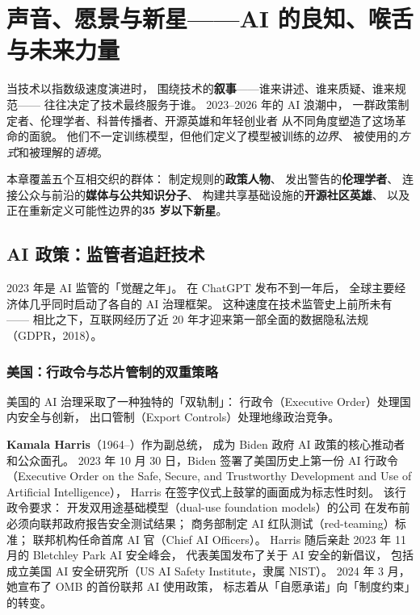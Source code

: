 \chapter{声音、愿景与新星——AI 的良知、喉舌与未来力量}
\label{ch:policy-rising}

当技术以指数级速度演进时，
围绕技术的\textbf{叙事}——谁来讲述、谁来质疑、谁来规范——
往往决定了技术最终服务于谁。
2023--2026 年的 AI 浪潮中，
一群政策制定者、伦理学者、科普传播者、开源英雄和年轻创业者
从不同角度塑造了这场革命的面貌。
他们不一定训练模型，但他们定义了模型被训练的\emph{边界}、
被使用的\emph{方式}和被理解的\emph{语境}。

本章覆盖五个互相交织的群体：
制定规则的\textbf{政策人物}、
发出警告的\textbf{伦理学者}、
连接公众与前沿的\textbf{媒体与公共知识分子}、
构建共享基础设施的\textbf{开源社区英雄}、
以及正在重新定义可能性边界的\textbf{35 岁以下新星}。

\section{AI 政策：监管者追赶技术}
\label{sec:policy}

2023 年是 AI 监管的「觉醒之年」。
在 ChatGPT 发布不到一年后，
全球主要经济体几乎同时启动了各自的 AI 治理框架。
这种速度在技术监管史上前所未有——
相比之下，互联网经历了近 20 年才迎来第一部全面的数据隐私法规（GDPR，2018）。

\subsection{美国：行政令与芯片管制的双重策略}

美国的 AI 治理采取了一种独特的「双轨制」：
行政令（Executive Order）处理国内安全与创新，
出口管制（Export Controls）处理地缘政治竞争。

\textbf{Kamala Harris}（1964--）作为副总统，
成为 Biden 政府 AI 政策的核心推动者和公众面孔。
2023 年 10 月 30 日，Biden 签署了美国历史上第一份
AI 行政令（Executive Order on the Safe, Secure, and Trustworthy
Development and Use of Artificial Intelligence），
Harris 在签字仪式上鼓掌的画面成为标志性时刻。
该行政令要求：
开发双用途基础模型（dual-use foundation models）的公司
在发布前必须向联邦政府报告安全测试结果；
商务部制定 AI 红队测试（red-teaming）标准；
联邦机构任命首席 AI 官（Chief AI Officers）。
Harris 随后亲赴 2023 年 11 月的 Bletchley Park AI 安全峰会，
代表美国发布了关于 AI 安全的新倡议，
包括成立美国 AI 安全研究所（US AI Safety Institute，隶属 NIST）。
2024 年 3 月，她宣布了 OMB 的首份联邦 AI 使用政策，
标志着从「自愿承诺」向「制度约束」的转变。

